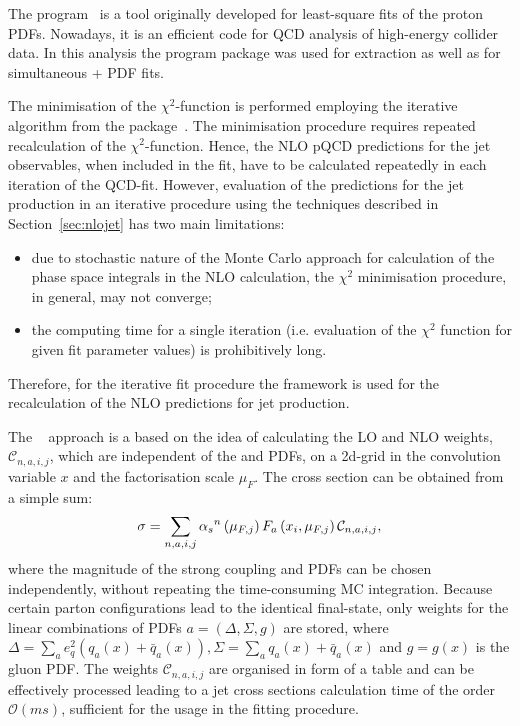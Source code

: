 The \herafitter program~\cite{Aaron:2009aa,Aaron:2009kv} is a tool originally developed for least-square fits of the proton PDFs. Nowadays, it is an efficient code for QCD analysis of high-energy collider data. In this analysis the \herafitter program package was used for \as extraction as well as for simultaneous \as+ PDF fits.

The minimisation of the $\chi^2$-function is performed employing the iterative \migrad algorithm from the \minuit package~\cite{James:1975dr}. The minimisation procedure requires repeated recalculation of the $\chi^2$-function. Hence, the NLO pQCD predictions for the jet observables, when included in the fit, have to be calculated repeatedly in each iteration of the QCD-fit. However, evaluation of the predictions for the jet production in an iterative procedure using the techniques described in Section~\ref{sec:nlojet} has two main limitations: 
\begin{itemize}
 \item due to stochastic nature of the Monte Carlo approach for calculation of the phase space integrals in the NLO calculation, the $\chi^2$ minimisation procedure,  in general, may not converge;
 \item the computing time for a single iteration (i.e. evaluation of the $\chi^2$ function for given fit parameter values) is prohibitively long.
\end{itemize}
Therefore, for the iterative fit procedure the \fastnlo framework is used for the recalculation of the NLO predictions for jet production. 

The \fastnlo~\cite{thesis:wobisch:2001,Kluge:2006,Wobisch:2011,Britzger:2012} approach is a based on the idea of calculating the LO and NLO weights, $\mathcal{C}_{n,a,i,j}$, which are independent of the \as and PDFs, on a 2d-grid in the convolution variable $x$ and the factorisation scale $\mu_F$. The cross section can be obtained from a simple sum:
\begin{equation}
\sigma = \sum_{n,a,i,j}{ \mbox{$\alpha_{s}$}^n\left( \mu_{F,j} \right) F_a\left( x_i, \mu_{F,j}\right)\mathcal{C}_{n,a,i,j} },
\end{equation}
where the magnitude of the strong coupling and PDFs can be chosen independently, without repeating the time-consuming MC integration. Because certain parton configurations lead to the identical final-state, only weights for the linear combinations of PDFs $a=\left( \Delta, \Sigma, g\right) $ are stored, where $\Delta=\sum_a{e_q^2\left(q_a\left(x\right)+\bar{q}_a\left(x\right)\right)}, \Sigma=\sum_a{q_a\left(x\right)+\bar{q}_a\left(x\right)}$ and $g=g\left(x\right)$ is the gluon PDF. The weights $\mathcal{C}_{n,a,i,j}$ are organised in form of a table and can be effectively processed leading to a jet cross sections calculation time of the order $\mathcal{O}\left( ms\right)$, sufficient for the usage in the fitting procedure.

